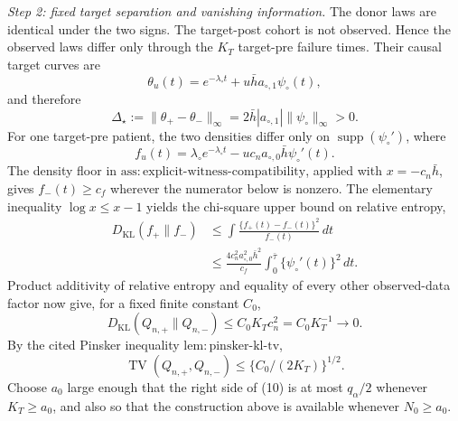 \emph{Step 2: fixed target separation and vanishing information.}
The donor laws are identical under the two signs.  The target-post cohort is not
observed.  Hence the observed laws differ only through the \(K_T\) target-pre
failure times.  Their causal target curves are
\[
\theta_u(t)=e^{-\lambda_\circ t}+u\bar h a_{\circ,1}\psi_\circ(t),
\]
and therefore
\[
\Delta_\star:=\|\theta_+-\theta_-\|_\infty
=2\bar h|a_{\circ,1}|\|\psi_\circ\|_\infty>0.
\tag{6}
\]
For one target-pre patient, the two densities differ only on
\(\operatorname{supp}(\psi_\circ')\), where
\[
f_u(t)=\lambda_\circ e^{-\lambda_\circ t}
-u c_n a_{\circ,0}\bar h\psi_\circ'(t).
\tag{7}
\]
The density floor in
\(\mathrm{ass:explicit\mbox{-}witness\mbox{-}compatibility}\), applied with
\(x=-c_n\bar h\), gives \(f_-(t)\geq c_f\) wherever the numerator below is
nonzero.  The elementary inequality \(\log x\leq x-1\) yields the chi-square
upper bound on relative entropy,
\[
\begin{aligned}
D_{\mathrm{KL}}(f_+\|f_-)
&\leq\int\frac{\{f_+(t)-f_-(t)\}^2}{f_-(t)}\,dt\\
&\leq\frac{4c_n^2a_{\circ,0}^2\bar h^2}{c_f}
\int_0^{\bar\tau}\{\psi_\circ'(t)\}^2\,dt.
\end{aligned}
\tag{8}
\]
Product additivity of relative entropy and equality of every other observed-data
factor now give, for a fixed finite constant \(C_0\),
\[
D_{\mathrm{KL}}(Q_{n,+}\|Q_{n,-})
\leq C_0K_Tc_n^2=C_0K_T^{-1}\longrightarrow0.
\tag{9}
\]
By the cited Pinsker inequality
\(\mathrm{lem:pinsker\mbox{-}kl\mbox{-}tv}\),
\[
\operatorname{TV}(Q_{n,+},Q_{n,-})
\leq\{C_0/(2K_T)\}^{1/2}.
\tag{10}
\]
Choose \(a_0\) large enough that the right side of (10) is at most
\(q_\alpha/2\) whenever \(K_T\geq a_0\), and also so that the construction above
is available whenever \(N_0\geq a_0\).

